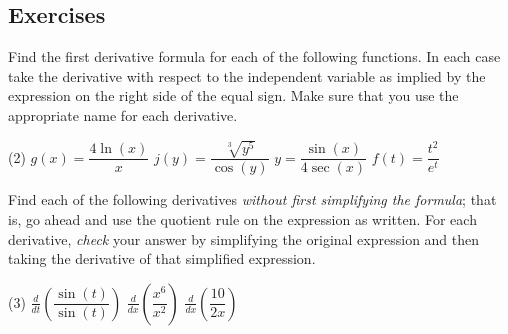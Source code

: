 \documentclass[10pt,oneside,]{book}
\theoremstyle{plain}
\theoremstyle{definition}
\numberwithin{equation}{section}
\newcommand{\fe}[2]{#1\mathopen{}\left(#2\right)\mathclose{}}
\newcommand{\lzoo}[2]{{\frac{d}{d#1}}{\left(#2\right)}}
\begin{document}
\subsection[Exercises]{Exercises}\label{exercises-38}
\hypertarget{exercisegroup-78}{\null}Find the first derivative formula for each of the following functions.  In each case take the derivative with respect to the independent variable as implied by the expression on the right side of the equal sign.  Make sure that you use the appropriate name for each derivative.%
\par
\begin{exercisegroup}(2)
\exercise[1.]\hypertarget{exercise-378}{\null}\(\fe{g}{x}=\dfrac{4\fe{\ln}{x}}{x}\)%
\exercise[2.]\hypertarget{exercise-379}{\null}\(\fe{j}{y}=\dfrac{\sqrt[3]{y^5}}{\fe{\cos}{y}}\)%
\exercise[3.]\hypertarget{exercise-380}{\null}\(y=\dfrac{\fe{\sin}{x}}{4\fe{\sec}{x}}\)%
\exercise[4.]\hypertarget{exercise-381}{\null}\(\fe{f}{t}=\dfrac{t^2}{e^t}\)%
\end{exercisegroup}
\par\smallskip\noindent
\hypertarget{exercisegroup-unsimplified-quotient}{\null}Find each of the following derivatives \emph{without first simplifying the formula}; that is, go ahead and use the quotient rule on the expression as written. For each derivative, \emph{check} your answer by simplifying the original expression and then taking the derivative of that simplified expression.%
\par
\begin{exercisegroup}(3)
\exercise[5.]\hypertarget{unsimplified-quotient-first}{\null}\(\lzoo{t}{\dfrac{\fe{\sin}{t}}{\fe{\sin}{t}}}\)%
\exercise[6.]\hypertarget{exercise-383}{\null}\(\lzoo{x}{\dfrac{x^6}{x^2}}\)%
\exercise[7.]\hypertarget{unsimplified-quotient-last}{\null}\(\lzoo{x}{\dfrac{10}{2x}}\)%
\end{exercisegroup}
\par\smallskip\noindent
\typeout{************************************************}
\typeout{************************************************}
\end{document}
